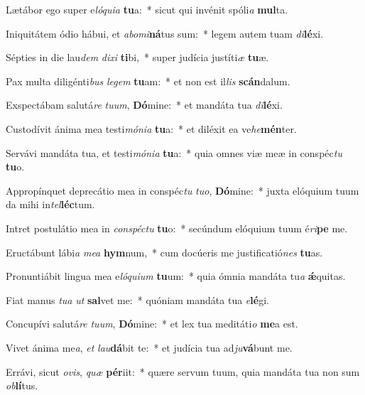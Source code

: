 \item Lætábor ego super e\textit{ló}\textit{qui}\textit{a} \textbf{tu}a:~* sicut qui invénit spóli\textit{a} \textbf{mul}ta.
\item Iniquitátem ódio hábui, et \textit{ab}\textit{o}\textit{mi}\textbf{ná}tus sum:~* legem autem tuam \textit{di}\textbf{lé}xi.
\item Sépties in die lau\textit{dem} \textit{di}\textit{xi} \textbf{ti}bi,~* super judícia justíti\textit{æ} \textbf{tu}æ.
\item Pax multa diligénti\textit{bus} \textit{le}\textit{gem} \textbf{tu}am:~* et non est il\textit{lis} \textbf{scán}dalum.
\item Exspectábam salutá\textit{re} \textit{tu}\textit{um}, \textbf{Dó}mine:~* et mandáta tua \textit{di}\textbf{lé}xi.
\item Custodívit ánima mea testi\textit{mó}\textit{ni}\textit{a} \textbf{tu}a:~* et diléxit ea ve\textit{he}\textbf{mén}ter.
\item Servávi mandáta tua, et testi\textit{mó}\textit{ni}\textit{a} \textbf{tu}a:~* quia omnes viæ meæ in conspéc\textit{tu} \textbf{tu}o.
\item Appropínquet deprecátio mea in conspéc\textit{tu} \textit{tu}\textit{o}, \textbf{Dó}mine:~* juxta elóquium tuum da mihi in\textit{tel}\textbf{léc}tum.
\item Intret postulátio mea in \textit{con}\textit{spéc}\textit{tu} \textbf{tu}o:~* secúndum elóquium tuum é\textit{ri}\textbf{pe} me.
\item Eructábunt lábi\textit{a} \textit{me}\textit{a} \textbf{hym}num,~* cum docúeris me justificatió\textit{nes} \textbf{tu}as.
\item Pronuntiábit lingua mea e\textit{ló}\textit{qui}\textit{um} \textbf{tu}um:~* quia ómnia mandáta tu\textit{a} \textbf{ǽ}quitas.
\item Fiat manus \textit{tu}\textit{a} \textit{ut} \textbf{sal}vet me:~* quóniam mandáta tua \textit{e}\textbf{lé}gi.
\item Concupívi salutá\textit{re} \textit{tu}\textit{um}, \textbf{Dó}mine:~* et lex tua meditáti\textit{o} \textbf{me}a est.
\item Vivet ánima me\textit{a}, \textit{et} \textit{lau}\textbf{dá}bit te:~* et judícia tua ad\textit{ju}\textbf{vá}bunt me.
\item Errávi, sicut \textit{o}\textit{vis}, \textit{quæ} \textbf{pér}iit:~* quære servum tuum, quia mandáta tua non sum \textit{ob}\textbf{lí}tus.
